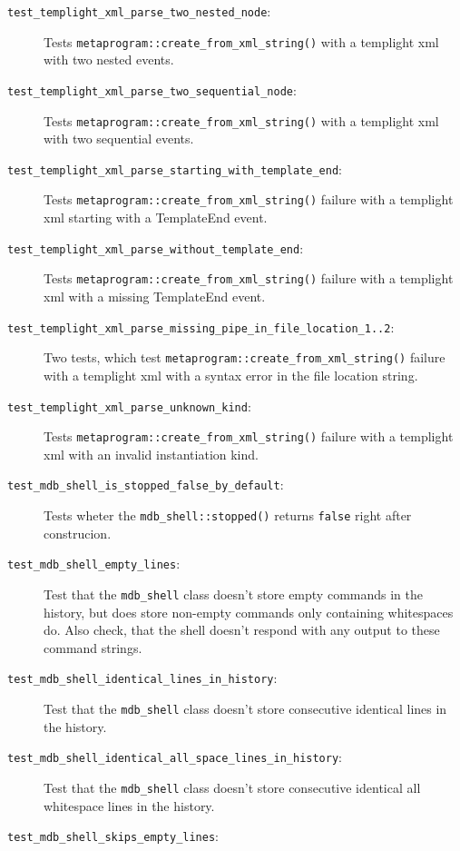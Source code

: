 \begin{description}
    \item[\texttt{test\_templight\_xml\_parse\_two\_nested\_node}:]
        Tests \texttt{metaprogram::create\_from\_xml\_string()} with a templight
        xml with two nested events.
    \item[\texttt{test\_templight\_xml\_parse\_two\_sequential\_node}:]
        Tests \texttt{metaprogram::create\_from\_xml\_string()} with a templight
        xml with two sequential events.
    \item[\texttt{test\_templight\_xml\_parse\_starting\_with\_template\_end}:]
        Tests \texttt{metaprogram::create\_from\_xml\_string()} failure with a
        templight xml starting with a TemplateEnd event.
    \item[\texttt{test\_templight\_xml\_parse\_without\_template\_end}:]
        Tests \texttt{metaprogram::create\_from\_xml\_string()} failure with a
        templight xml with a missing TemplateEnd event.
    \item[\texttt{test\_templight\_xml\_parse\_missing\_pipe\_in\_file\_location\_1..2}:]
        Two tests, which test \texttt{metaprogram::create\_from\_xml\_string()}
        failure with a templight xml with a syntax error in the file location
        string.
    \item[\texttt{test\_templight\_xml\_parse\_unknown\_kind}:]
        Tests \texttt{metaprogram::create\_from\_xml\_string()} failure with a
        templight xml with an invalid instantiation kind.
    \item[\texttt{test\_mdb\_shell\_is\_stopped\_false\_by\_default}:]
        Tests wheter the \texttt{mdb\_shell::stopped()} returns \texttt{false}
        right after construcion.
    \item[\texttt{test\_mdb\_shell\_empty\_lines}:]
        Test that the \texttt{mdb\_shell} class doesn't store empty commands
        in the history, but does store non-empty commands only containing
        whitespaces do. Also check, that the shell doesn't respond with any
        output to these command strings.
    \item[\texttt{test\_mdb\_shell\_identical\_lines\_in\_history}:]
        Test that the \texttt{mdb\_shell} class doesn't store consecutive
        identical lines in the history.
    \item[\texttt{test\_mdb\_shell\_identical\_all\_space\_lines\_in\_history}:]
        Test that the \texttt{mdb\_shell} class doesn't store consecutive
        identical all whitespace lines in the history.
    \item[\texttt{test\_mdb\_shell\_skips\_empty\_lines}:]

\end{description}
